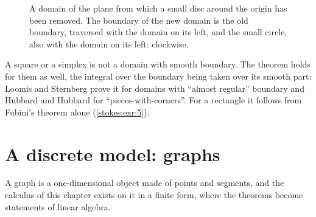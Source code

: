 \begin{notechapter}
\begin{figure}[ht]
\centering
{}
\caption{A domain of the plane from which a small disc around the
origin has been removed. The boundary of the new domain is the old
boundary, traversed with the domain on its left, and the small circle,
also with the domain on its left: clockwise.}
\label{stokes:fig:winding}
\end{figure}

\begin{remark}[Corners]\label{stokes:rem:corners}
A square or a simplex is not a domain with smooth boundary. The theorem
holds for them as well, the integral over the boundary being taken over
its smooth part: Loomis and Sternberg prove it for domains with
``almost regular'' boundary and Hubbard and Hubbard for
``pieces-with-corners''. For a rectangle it follows from Fubini's
theorem alone (\cref{stokes:exr:5}).
\end{remark}

\section{A discrete model: graphs}\label{stokes:sec:graphs}

A graph is a one-dimensional object made of points and segments, and
the calculus of this chapter exists on it in a finite form, where the
theorems become statements of linear algebra.


\end{notechapter}
